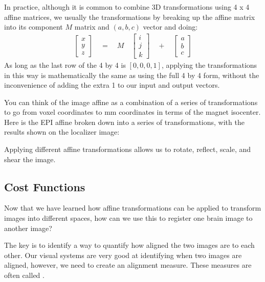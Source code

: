 \documentclass[letterpaper,10pt,english]{sphinxmanual}
\begin{document}
In practice, although it is common to combine 3D transformations using 4 x 4 affine matrices, we usually  the transformations by breaking up the affine matrix into its component \(M\) matrix and \((a, b, c)\) vector and doing:
\begin{equation*}
\begin{split}
\begin{bmatrix}
x \\
y \\
z
\end{bmatrix}
\quad
=
\quad
M
\quad
\begin{bmatrix}
i \\
j \\
k
\end{bmatrix}
\quad
+
\quad
\begin{bmatrix}
a \\
b \\
c
\end{bmatrix}
\end{split}
\end{equation*}
As long as the last row of the 4 by 4 is \([0, 0, 0, 1]\), applying the transformations in this way is mathematically the same as using the full 4 by 4 form, without the inconvenience of adding the extra 1 to our input and output vectors.

You can think of the image affine as a combination of a series of transformations to go from voxel coordinates to mm coordinates in terms of the magnet isocenter. Here is the EPI affine broken down into a series of transformations, with the results shown on the localizer image:

\noindent{}

Applying different affine transformations allows us to rotate, reflect, scale, and shear the image.


\subsection{Cost Functions}
\label{\detokenize{content/Preprocessing:cost-functions}}
Now that we have learned how affine transformations can be applied to transform images into different spaces, how can we use this to register one brain image to another image?

The key is to identify a way to quantify how aligned the two images are to each other. Our visual systems are very good at identifying when two images are aligned, however, we need to create an alignment measure. These measures are often called .
\end{document}
